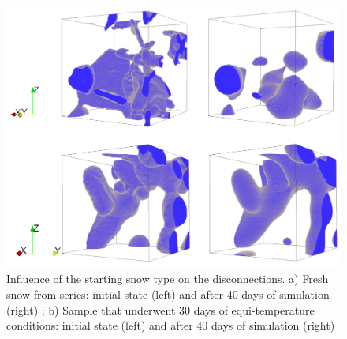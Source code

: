 \documentclass[draft,ms]{agujournal2019}
\begin{document}
\begin{figure}
    \centering
    \includegraphics[width=0.7\linewidth]{Figures/disconnections_iso01_iso15.pdf}
    \caption{Influence of the starting snow type on the disconnections. a) Fresh snow from \protect\cite{flin_three-dimensional_2004} series: initial state (left) and after 40 days of simulation (right) ; b) Sample that underwent 30 days of equi-temperature conditions: initial state (left) and after 40 days of simulation (right) }
    \label{fig:disco}
\end{figure}
\end{document}
